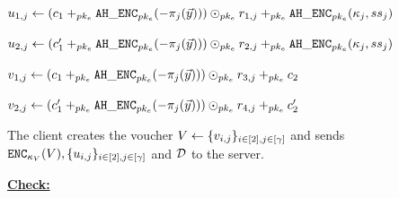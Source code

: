 \begin{figure}[th!]
\begin{mdframed}
\item $\secretShareEncryption{1, \projIdx} \assign (\ciphertext[1] \homomorphicAdd{\encryptPubKey} \ahencrypt[\encryptPubKey](-\projFn[\projIdx](\clientVec))) \homomorphicScalerMult{\encryptPubKey} \genericRand[1, \projIdx] \homomorphicAdd{\encryptPubKey} \ahencrypt[\encryptPubKey](\genericSymmKey_{\projIdx}, \secretShare{\projIdx})$
\item $\secretShareEncryption{2, \projIdx} \assign (\ciphertext[1]' \homomorphicAdd{\encryptPubKey} \ahencrypt[\encryptPubKey](-\projFn[\projIdx](\clientVec))) \homomorphicScalerMult{\encryptPubKey} \genericRand[2, \projIdx] \homomorphicAdd{\encryptPubKey} \ahencrypt[\encryptPubKey](\genericSymmKey_{\projIdx}, \secretShare{\projIdx})$
\item $\partitionEncryption{1, \projIdx} \assign (\ciphertext[1] \homomorphicAdd{\encryptPubKey} \ahencrypt[\encryptPubKey](-\projFn[\projIdx](\clientVec))) \homomorphicScalerMult{\encryptPubKey} \genericRand[3, \projIdx]\homomorphicAdd{\encryptPubKey} \ciphertext[2]$
\item $\partitionEncryption{2, \projIdx} \assign (\ciphertext[1]' \homomorphicAdd{\encryptPubKey} \ahencrypt[\encryptPubKey](-\projFn[\projIdx](\clientVec))) \homomorphicScalerMult{\encryptPubKey} \genericRand[4, \projIdx] \homomorphicAdd{\encryptPubKey} \ciphertext[2]'$

\enumListEnd

\item The client creates the voucher $\voucher \assign \{ \partitionEncryption{\tblIdx,\projIdx} \}_{\tblIdx \in \nats[2], \projIdx \in \nats[\numProjections]}$ and sends $\encrypt[\voucherKey](\voucher), \{\secretShareEncryption{\tblIdx,\projIdx}\}_{\tblIdx \in [2], \projIdx \in \nats[\numProjections]}$ and $\dhfSet$ to the server.  
\enumListEnd

\noindent\textbf{\underline{Check:}}



\end{mdframed}
\end{figure}
